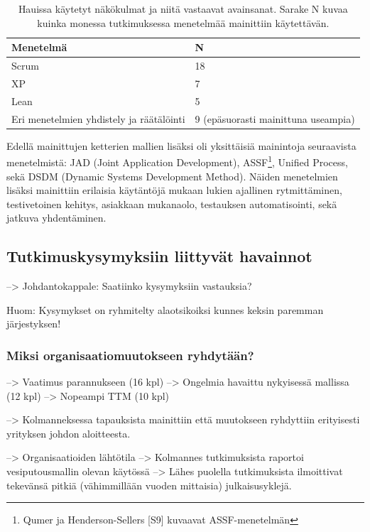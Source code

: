 \begin{table}[h]
    \begin{tabular}{|l|l|}
        \hline
        Menetelmä       & N   \\ \hline
        Scrum           & 18 \\ 
        XP              & 7 \\
        Lean            & 5 \\
        Eri menetelmien yhdistely ja räätälöinti & 9  (epäsuorasti mainittuna useampia) \\
        \hline
    \end{tabular}
	\caption{Hauissa käytetyt näkökulmat ja niitä vastaavat avainsanat. Sarake N
	kuvaa kuinka monessa tutkimuksessa menetelmää mainittiin käytettävän.}
	\label{table:practices}
\end{table}

Edellä mainittujen ketterien mallien lisäksi oli yksittäisiä mainintoja
seuraavista menetelmistä: JAD (Joint Application Development),
ASSF\footnote{Qumer ja Henderson-Sellers [S9] kuvaavat ASSF-menetelmän}, Unified
Process, sekä DSDM (Dynamic Systems Development Method). Näiden menetelmien
lisäksi mainittiin erilaisia käytäntöjä mukaan lukien ajallinen rytmittäminen,
testivetoinen kehitys, asiakkaan mukanaolo, testauksen automatisointi, sekä
jatkuva yhdentäminen.

\subsection{Tutkimuskysymyksiin liittyvät havainnot}

--> Johdantokappale: Saatiinko kysymyksiin vastauksia?

Huom: Kysymykset on ryhmitelty alaotsikoiksi kunnes keksin paremman järjestyksen!
 
\subsubsection{Miksi organisaatiomuutokseen ryhdytään?}

--> Vaatimus parannukseen (16 kpl)
--> Ongelmia havaittu nykyisessä mallissa (12 kpl)
--> Nopeampi TTM (10 kpl)

--> Kolmanneksessa tapauksista mainittiin että muutokseen ryhdyttiin erityisesti
yrityksen johdon aloitteesta.

--> Organisaatioiden lähtötila
--> Kolmannes tutkimuksista raportoi vesiputousmallin olevan käytössä
--> Lähes puolella tutkimuksista ilmoittivat tekevänsä pitkiä (vähimmillään
vuoden mittaisia) julkaisusyklejä.

